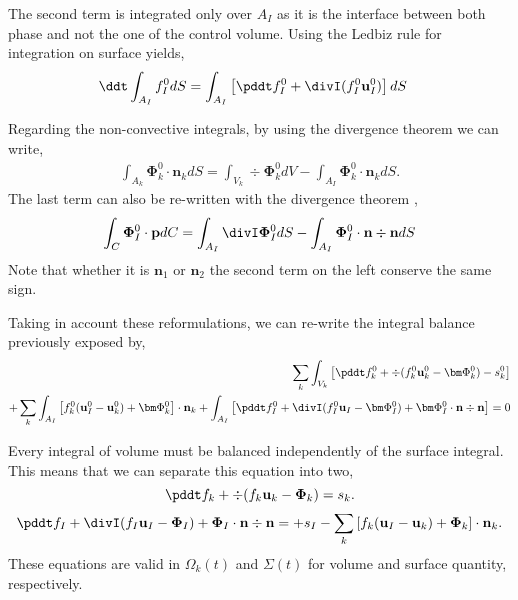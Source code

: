 The second term is integrated only over $A_I$ as it is the interface between both phase and not the one of the control volume. 
Using the Ledbiz rule for integration on surface yields, 
\begin{align*}
    \ddt \int_{A_I} f_I^0 dS 
    &= \int_{A_I} \left[
        \pddt f_I^0  + \divI (f_I^0 \textbf{u}_I^0) 
    \right]dS
\end{align*}

Regarding the non-convective integrals, by using the divergence theorem we can write\citep{nadim1996concise}, 
\begin{align*}
    \int_{A_k} \mathbf{\Phi}_k^0\cdot \textbf{n}_k dS
    = \int_{V_k} \div\mathbf{\Phi}_k^0 dV
    - \int_{A_I} \mathbf{\Phi}_k^0\cdot \textbf{n}_k dS. 
\end{align*}
The last term can also be re-written with the divergence theorem \citet{nadim1996concise},
\begin{align*}
    \int_{C} \mathbf{\Phi}_I^0\cdot \textbf{p} dC 
    = \int_{A_I} \divI \mathbf{\Phi}_I^0 dS
    - \int_{A_I} \mathbf{\Phi}_I^0 \cdot \textbf{n} \div \textbf{n} dS
\end{align*}
Note that whether it is $\textbf{n}_1$ or $\textbf{n}_2$ the second term on the left conserve the same sign. 

Taking in account these reformulations, we can re-write the integral balance previously exposed by, 
\begin{align*}
    \sum_k \int_{V_k}{\left[
        \pddt f_k^0
        + \div (f_k^0\textbf{u}_k^0 - \bm\Phi_k^0)
        - s_k^0
    \right]}\\
    + \sum_k\int_{A_I}{\left[
        f_k^0(\textbf{u}_I^0 - \textbf{u}_k^0)
        + \bm\Phi_k^0
    \right]\cdot \textbf{n}_k}
    + \int_{A_I}{\left[
        \pddt f_I^0 
        + \divI (f_I^0 \textbf{u}_I - \bm\Phi_I^0)
        + \bm\Phi_I^0 \cdot \textbf{n} \div \textbf{n}
    \right]} =0 
\end{align*}

Every integral of volume must be balanced independently of the surface integral. 
This means that we can separate this equation into two, 
\begin{equation*}
    \pddt f_k  
    + \div (f_k \textbf{u}_k - \mathbf{\Phi}_k) 
    =s_k. 
\end{equation*}
\begin{equation}
    \pddt f_I  
    + \divI (f_I \textbf{u}_I -\mathbf{\Phi}_I)
    + \mathbf{\Phi}_I \cdot \textbf{n} \div \textbf{n}
    = 
    + s_I
    - \sum_k \left[
    f_k (\textbf{u}_I - \textbf{u}_k)
    + \mathbf{\Phi}_k
    \right] \cdot \textbf{n}_k. 
    \label{ap:eq:dt_f_I}
\end{equation}
These equations are valid in $\Omega_k(t)$ and $\Sigma(t)$ for volume and surface quantity, respectively. 

